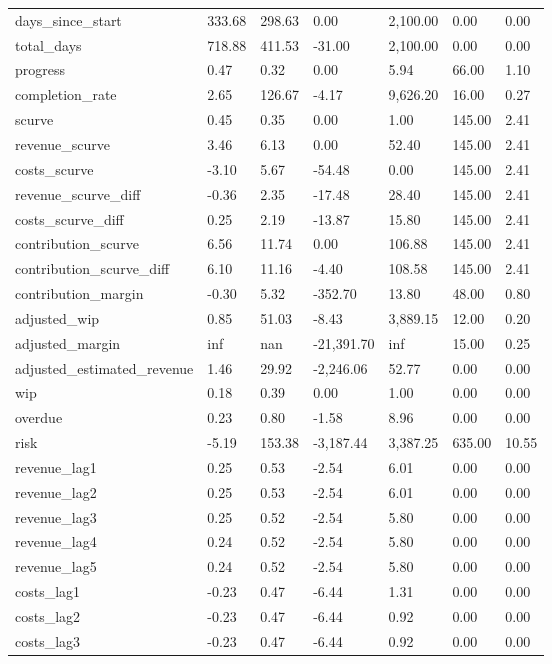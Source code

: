 \begin{landscape}
\begin{longtable}[h!]{lllllll}
days_since_start & 333.68 & 298.63 & 0.00 & 2,100.00 & 0.00 & 0.00 \\
total_days & 718.88 & 411.53 & -31.00 & 2,100.00 & 0.00 & 0.00 \\
progress & 0.47 & 0.32 & 0.00 & 5.94 & 66.00 & 1.10 \\
completion_rate & 2.65 & 126.67 & -4.17 & 9,626.20 & 16.00 & 0.27 \\
scurve & 0.45 & 0.35 & 0.00 & 1.00 & 145.00 & 2.41 \\
revenue_scurve & 3.46 & 6.13 & 0.00 & 52.40 & 145.00 & 2.41 \\
costs_scurve & -3.10 & 5.67 & -54.48 & 0.00 & 145.00 & 2.41 \\
revenue_scurve_diff & -0.36 & 2.35 & -17.48 & 28.40 & 145.00 & 2.41 \\
costs_scurve_diff & 0.25 & 2.19 & -13.87 & 15.80 & 145.00 & 2.41 \\
contribution_scurve & 6.56 & 11.74 & 0.00 & 106.88 & 145.00 & 2.41 \\
contribution_scurve_diff & 6.10 & 11.16 & -4.40 & 108.58 & 145.00 & 2.41 \\
contribution_margin & -0.30 & 5.32 & -352.70 & 13.80 & 48.00 & 0.80 \\
adjusted_wip & 0.85 & 51.03 & -8.43 & 3,889.15 & 12.00 & 0.20 \\
adjusted_margin & inf & nan & -21,391.70 & inf & 15.00 & 0.25 \\
adjusted_estimated_revenue & 1.46 & 29.92 & -2,246.06 & 52.77 & 0.00 & 0.00 \\
wip & 0.18 & 0.39 & 0.00 & 1.00 & 0.00 & 0.00 \\
overdue & 0.23 & 0.80 & -1.58 & 8.96 & 0.00 & 0.00 \\
risk & -5.19 & 153.38 & -3,187.44 & 3,387.25 & 635.00 & 10.55 \\
revenue_lag1 & 0.25 & 0.53 & -2.54 & 6.01 & 0.00 & 0.00 \\
revenue_lag2 & 0.25 & 0.53 & -2.54 & 6.01 & 0.00 & 0.00 \\
revenue_lag3 & 0.25 & 0.52 & -2.54 & 5.80 & 0.00 & 0.00 \\
revenue_lag4 & 0.24 & 0.52 & -2.54 & 5.80 & 0.00 & 0.00 \\
revenue_lag5 & 0.24 & 0.52 & -2.54 & 5.80 & 0.00 & 0.00 \\
costs_lag1 & -0.23 & 0.47 & -6.44 & 1.31 & 0.00 & 0.00 \\
costs_lag2 & -0.23 & 0.47 & -6.44 & 0.92 & 0.00 & 0.00 \\
costs_lag3 & -0.23 & 0.47 & -6.44 & 0.92 & 0.00 & 0.00 \\

\end{longtable}
\end{landscape}
